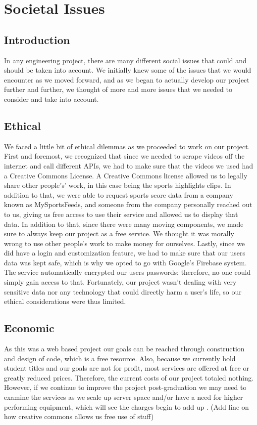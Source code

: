 \chapter{Societal Issues}

\section{Introduction}
\par In any engineering project, there are many different social issues that could and should be taken into account. We initially knew some of the issues that we would encounter as we moved forward, and as we began to actually develop our project further and further, we thought of more and more issues that we needed to consider and take into account. 

\section{Ethical}
\par We faced a little bit of ethical dilemmas as we proceeded to work on our project. First and foremost, we recognized that since we needed to scrape videos off the internet and call different APIs, we had to make sure that the videos we used had a Creative Commons License. A Creative Commons license allowed us to legally share other people's’ work, in this case being the sports highlights clips. In addition to that, we were able to request  sports score data from a company known as MySportsFeeds, and someone from the company personally reached out to us, giving us free access to use their service and allowed us to display that data. In addition to that, since there were many moving components, we made sure to always keep our project as a free service. We thought it was morally wrong to use other people's work to make money for ourselves. Lastly, since we did have a login and customization feature, we had to make sure that our users data was kept safe, which is why we opted to go with Google’s Firebase system. The service automatically encrypted our users passwords; therefore, no one could simply gain access to that. Fortunately, our project wasn’t dealing with very sensitive data nor any technology that could directly harm a user’s life, so our ethical considerations were thus limited.

\section{Economic}
\par As this was a web based project our goals can be reached through construction and design of code, which is a free resource. Also, because we currently hold student titles and our goals are not for profit, most services are offered at free or greatly reduced prices. Therefore, the current costs of our project totaled nothing. However, if we continue to improve the project post-graduation we may need to examine the services as we scale up server space and/or have a need for higher performing equipment, which will see the charges begin to add up . (Add line on how creative commons allows us free use of stuff) 

